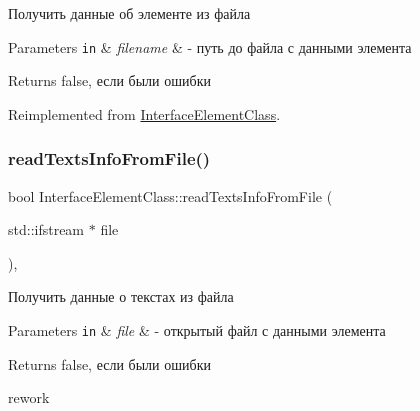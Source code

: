 Получить данные об элементе из файла 


\begin{DoxyParams}[1]{Parameters}
\mbox{\tt in}  & {\em filename} & -\/ путь до файла с данными элемента \\
\hline
\end{DoxyParams}
\begin{DoxyReturn}{Returns}
false, если были ошибки 
\end{DoxyReturn}


Reimplemented from \hyperlink{class_interface_element_class_aadd932731787c60b3f395422188f2f58}{Interface\+Element\+Class}.

\mbox{\label{class_interface_element_class_afc8ee340b6aa0b99e3280b424aa5c519}} 
\subsubsection{\texorpdfstring{read\+Texts\+Info\+From\+File()}{readTextsInfoFromFile()}}
{\footnotesize\ttfamily bool Interface\+Element\+Class\+::read\+Texts\+Info\+From\+File (\begin{DoxyParamCaption}\item[{std\+::ifstream $\ast$}]{file }\end{DoxyParamCaption})\hspace{0.3cm}{\ttfamily [protected]}, {\ttfamily [inherited]}}



Получить данные о текстах из файла 


\begin{DoxyParams}[1]{Parameters}
\mbox{\tt in}  & {\em file} & -\/ открытый файл с данными элемента \\
\hline
\end{DoxyParams}
\begin{DoxyReturn}{Returns}
false, если были ошибки 
\end{DoxyReturn}
rework \mbox{\label{class_list_element_class_a646a703bc701884f664769fab21b25d6}} 
